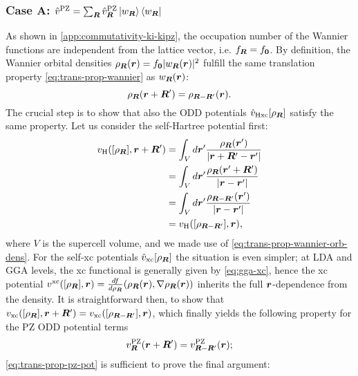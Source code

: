 \subsubsection*{Case A: $\hat{v}^{\rm PZ} = \sum_{{\bm R}} \hat{v}^{\rm PZ}_{{\bm R}} \ket{w_{{\bm R}}} \bra{w_{{\bm R}}}$}
As shown in \cref{app:commutativity-ki-kipz}, the occupation number of the Wannier functions are independent from the lattice vector, i.e. $f_{{\bm R}} = f_{\bm 0}$. By definition, the Wannier orbital densities $\rho_{{\bm R}}({\bm r}) = f_{\bm 0} |w_{{\bm R}}({\bm r})|^2$ fulfill the same translation property \eqref{eq:trans-prop-wannier} as $w_{{\bm R}}({\bm r})$:
%
\begin{equation}
    \rho_{{\bm R}}({\bm r} + {\bm R}') = \rho_{{\bm R} - {\bm R}'}({\bm r}) .
    \label{eq:trans-prop-wannier-orb-dens}
\end{equation}
%
The crucial step is to show that also the ODD potentials $\hat{v}_{\rm Hxc}[\rho_{{\bm R}}]$ satisfy the same property. Let us consider the self-Hartree potential first:
%
\begin{equation}
    \begin{split}
        v_{\rm H}([\rho_{{\bm R}}],{\bm r} + {\bm R}') & = \int_V d{\bm r}' \frac{\rho_{{\bm R}}({\bm r}')}{|{\bm r} + {\bm R}' - {\bm r}'|} \\ 
        & = \int_V d{\bm r}' \frac{\rho_{{\bm R}}({\bm r}' + {\bm R}')}{|{\bm r} - {\bm r}'|} \\
        & = \int_V d{\bm r}' \frac{\rho_{{\bm R} - {\bm R}'}({\bm r}')}{|{\bm r} - {\bm r}'|} \\
        & = v_{\rm H}([\rho_{{\bm R} - {\bm R}'}],{\bm r}) ,
    \end{split}
    \label{eq:trans-prop-hartree-pot}
\end{equation}
%
where $V$ is the supercell volume, and we made use of \cref{eq:trans-prop-wannier-orb-dens}. For the self-xc potentials $\hat{v}_{\rm xc}[\rho_{{\bm R}}]$ the situation is even simpler; at LDA and GGA levels, the xc functional is generally given by \cref{eq:gga-xc}, hence the xc potential $v^{\rm xc}([\rho_{{\bm R}}],{\bm r}) = \frac{df}{d\rho_{{\bm R}}}(\rho_{{\bm R}}({\bm r}), \nabla\rho_{{\bm R}}({\bm r}))$ inherits the full ${\bm r}$-dependence from the density. It is straightforward then, to show that $v_{\rm xc}([\rho_{{\bm R}}],{\bm r} + {\bm R}') = v_{\rm xc}([\rho_{{\bm R} - {\bm R}'}],{\bm r})$, which finally yields the following property for the PZ ODD potential terms
%
\begin{equation}
    v^{\rm PZ}_{{\bm R}}({\bm r} + {\bm R}') = v^{\rm PZ}_{{\bm R} - {\bm R}'}({\bm r}) ;
    \label{eq:trans-prop-pz-pot}
\end{equation}
%
\cref{eq:trans-prop-pz-pot} is sufficient to prove the final argument:
%

